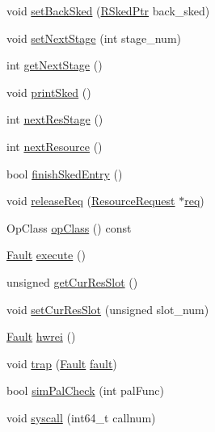 \begin{DoxyCompactItemize}
\item 
void \hyperlink{classInOrderDynInst_a46d964285ae05aeb9ea40f8bd0646a10}{setBackSked} (\hyperlink{classResourceSked}{RSkedPtr} back\_\-sked)
\item 
void \hyperlink{classInOrderDynInst_afda8644057fdd69ee5f1c323c6f6ce4f}{setNextStage} (int stage\_\-num)
\item 
int \hyperlink{classInOrderDynInst_aa05eaedc24bd1656294edb1d9d4a0efa}{getNextStage} ()
\item 
void \hyperlink{classInOrderDynInst_af00b2d517cd8e4731bb364323a9dfeb4}{printSked} ()
\item 
int \hyperlink{classInOrderDynInst_aa02e7187dfc8362ccab8d685f87c2761}{nextResStage} ()
\item 
int \hyperlink{classInOrderDynInst_a2a5d40a6b54c058587d5f955711ffd11}{nextResource} ()
\item 
bool \hyperlink{classInOrderDynInst_a3a3248cb4b3c8f99af61fdc4bc3ca8ab}{finishSkedEntry} ()
\item 
void \hyperlink{classInOrderDynInst_a2f0511ef9f7325bcf7a8941e371ea85b}{releaseReq} (\hyperlink{classResourceRequest}{ResourceRequest} $\ast$\hyperlink{classInOrderDynInst_a0baf46c33fa5906d6c21b3fcc0176acf}{req})
\item 
OpClass \hyperlink{classInOrderDynInst_aa4919f97cae20d4d82391c1fc6d5fda6}{opClass} () const 
\item 
\hyperlink{classRefCountingPtr}{Fault} \hyperlink{classInOrderDynInst_a1a8de76be7ad0985553c5bae9f26a55b}{execute} ()
\item 
unsigned \hyperlink{classInOrderDynInst_a7f7b059d1a3fea3a291eca89c5145de9}{getCurResSlot} ()
\item 
void \hyperlink{classInOrderDynInst_a2a0d7162a5f0908ca1c266d72f1de9f1}{setCurResSlot} (unsigned slot\_\-num)
\item 
\hyperlink{classRefCountingPtr}{Fault} \hyperlink{classInOrderDynInst_a5f42e07ae335dff417664e91518c7f1e}{hwrei} ()
\item 
void \hyperlink{classInOrderDynInst_ac74f75adb89c94e4387498067f5567ff}{trap} (\hyperlink{classRefCountingPtr}{Fault} \hyperlink{classInOrderDynInst_a68714ceb74c60ea7ef5dec335bb6c5d7}{fault})
\item 
bool \hyperlink{classInOrderDynInst_a461205960be9d52e9beda48a77e9c600}{simPalCheck} (int palFunc)
\item 
void \hyperlink{classInOrderDynInst_a36e0b96120fcbbc2ee8699158f7be5c2}{syscall} (int64\_\-t callnum)
\item 

\end{DoxyCompactItemize}
